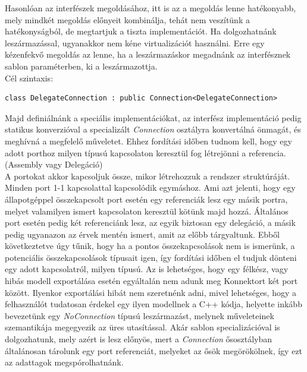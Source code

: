 \documentclass[a4paper,12pt]{report}
\begin{document}
Hasonlóan az interfészek megoldásához, itt is az a megoldás lenne hatékonyabb, mely mindkét megoldás előnyeit kombinálja, tehát nem veszítünk a hatékonyságból, de megtartjuk a tiszta implementációt. Ha dolgozhatnánk leszármazással, ugyanakkor nem kéne virtualizációt használni. Erre egy kézenfekvő megoldás az lenne, ha a leszármazáskor megadnánk az interfésznek sablon paraméterben, ki a leszármazottja. \\
Cél szintaxis:
\begin{lstlisting}
class DelegateConnection : public Connection<DelegateConnection>
\end{lstlisting}

Majd definiálnánk a speciális implementációkat, az interfész implementáció pedig statikus konverzióval a specializált \textit{Connection} osztályra konvertálná önmagát, és meghívná a megfelelő műveletet. Ehhez fordítási időben tudnom kell, hogy egy adott porthoz milyen típusú kapcsolaton keresztül fog létrejönni a referencia. (Assembly vagy Delegáció) \\ 
A portokat akkor kapcsoljuk össze, mikor létrehozzuk a rendszer struktúráját. Minden port 1-1 kapcsolattal kapcsolódik egymáshoz. Ami azt jelenti, hogy egy állapotgéppel összekapcsolt port esetén egy referenciák lesz egy másik portra, melyet valamilyen ismert kapcsolaton keresztül kötünk majd hozzá. Általános port esetén pedig két referenciánk lesz, az egyik biztosan egy delegáció, a másik pedig ugyanazon az érvek mentén ismert, amit az előbb tárgyaltunk. Ebből következtetve úgy tűnik, hogy ha a pontos összekapcsolások nem is ismerünk, a potenciális összekapcsolások típusait igen, így fordítási időben el tudjuk dönteni egy adott kapcsolatról, milyen típusú. Az is lehetséges, hogy egy félkész, vagy hibás modell exportálása esetén egyáltalán nem adunk meg Konnektort két port között. Ilyenkor exportálási hibát nem szeretnénk adni, mivel lehetséges, hogy a felhasználót tudatosan érdekel egy ilyen modellnek a C++ kódja, helyette inkább bevezetünk egy \textit{NoConnection} típusú leszármazást, melynek műveleteinek szemantikája megegyezik az üres utasítással. Akár sablon specializációval is dolgozhatunk, mely azért is lesz előnyös, mert a \textit{Connection} ősosztályban általánosan tárolunk egy port referenciát, melyeket az ősök megörökölnek, így ezt az adattagok megspórolhatnánk.
\end{document}
